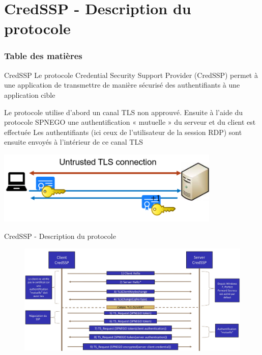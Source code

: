\documentclass{beamer}
\begin{document}
\section{CredSSP - Description du protocole}


\begin{frame}
	\frametitle{Table des matières}
	\tableofcontents[currentsection]
\end{frame}


\begin{frame}{CredSSP}
Le protocole Credential Security Support Provider (CredSSP) permet à une application de transmettre de manière sécurisé des authentifiants à une application cible
\newline

Le protocole utilise d'abord un canal TLS non approuvé. Ensuite  à l'aide du protocole SPNEGO  une authentification « mutuelle » du serveur et du client est effectuée
Les authentifiants (ici ceux de l'utilisateur de la session RDP) sont ensuite envoyés à l'intérieur de ce canal TLS
\newline
\begin{center}
\includegraphics[width=0.8\textwidth,height=0.3\textheight]{credssp.png}
\end{center}
\end{frame}

\begin{frame}{CredSSP - Description du protocole}
\begin{figure}
\includegraphics[scale=0.12]{graph.jpg}
\end{figure}
\end{frame}
\end{document}
